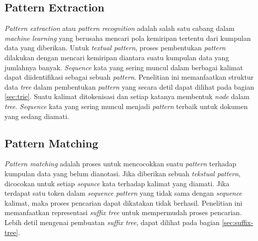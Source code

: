 \subsection{Pattern Extraction}
\textit{Pattern extraction} atau \textit{pattern recognition} adalah salah satu cabang dalam \textit{machine learning} yang berusaha mencari pola kemiripan tertentu dari kumpulan data yang diberikan. Untuk \textit{textual pattern}, proses pembentukan \textit{pattern} dilakukan dengan mencari kemiripan diantara suatu kumpulan data yang jumlahnya banyak. \textit{Sequence} kata yang sering muncul dalam berbagai kalimat dapat diidentifikasi sebagai sebuah \textit{pattern}. Penelitian ini memanfaatkan struktur data \textit{tree} dalam pembentukan \textit{pattern} yang secara detil dapat dilihat pada bagian \ref{sec:trie}. Suatu kalimat ditokenisasi dan setiap katanya membentuk \textit{node} dalam \textit{tree}. \textit{Sequence} kata yang sering muncul menjadi \textit{pattern} terbaik untuk dokumen yang sedang diamati.

\subsection{Pattern Matching}
\textit{Pattern matching} adalah proses untuk mencocokkan suatu \textit{pattern} terhadap kumpulan data yang belum dianotasi. Jika diberikan sebuah \textit{tekstual pattern}, dicocokan untuk setiap \textit{sequnce} kata terhadap kalimat yang diamati. Jika terdapat satu token dalam \textit{sequence pattern} yang tidak sama dengan \textit{sequence} kalimat, maka proses pencarian dapat dikatakan tidak berhasil. Penelitian ini memanfaatkan representasi \textit{suffix tree} untuk mempermudah proses pencarian. Lebih detil mengenai pembuatan \textit{suffix tree}, dapat dilihat pada bagian \ref{sec:suffix-tree}.


